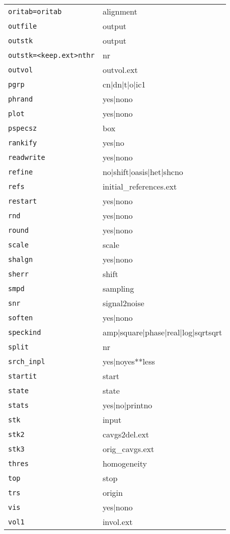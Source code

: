 \documentclass[review]{elsarticle}
\begin{document}
\begin{tabular}{ll}
\texttt{oritab=oritab}&{alignment}\\
\texttt{outfile}&{output}\\
\texttt{outstk}&{output}\\
\texttt{outstk=<keep.ext>nthr}&{nr}\\
\texttt{outvol}&{outvol.ext}\\
\texttt{pgrp}&{cn|dn|t|o|i{c1}}\\
\texttt{phrand}&{yes|no{no}}\\
\texttt{plot}&{yes|no{no}}\\
\texttt{pspecsz}&{box}\\
\texttt{rankify}&{yes|no}\\
\texttt{readwrite}&{yes|no{no}}\\
\texttt{refine}&{no|shift|oasis|het|shc{no}}\\
\texttt{refs}&{initial\_references.ext}\\
\texttt{restart}&{yes|no{no}}\\
\texttt{rnd}&{yes|no{no}}\\
\texttt{round}&{yes|no{no}}\\
\texttt{scale}&{scale}\\
\texttt{shalgn}&{yes|no{no}}\\
\texttt{sherr}&{shift}\\
\texttt{smpd}&{sampling}\\
\texttt{snr}&{signal2noise}\\
\texttt{soften}&{yes|no{no}}\\
\texttt{speckind}&{amp|square|phase|real|log|sqrt{sqrt}}\\
\texttt{split}&{nr}\\
\texttt{srch\_inpl}&{yes|no{yes}**less}\\
\texttt{startit}&{start}\\
\texttt{state}&{state}\\
\texttt{stats}&{yes|no|print{no}}\\
\texttt{stk}&{input}\\
\texttt{stk2}&{cavgs2del.ext}\\
\texttt{stk3}&{orig\_cavgs.ext}\\
\texttt{thres}&{homogeneity}\\
\texttt{top}&{stop}\\
\texttt{trs}&{origin}\\
\texttt{vis}&{yes|no{no}}\\
\texttt{vol1}&{invol.ext}\\

\end{tabular}
\end{document}
